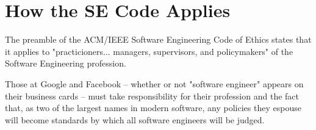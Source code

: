 
\section{How the SE Code Applies}

The preamble of the ACM/IEEE Software Engineering Code of Ethics states that it applies to "practicioners... managers, supervisors, and policymakers" of the Software Engineering profession. \cite{se_code}

Those at Google and Facebook -- whether or not "software engineer" appears on their business cards -- must take responsibility for their profession and the fact that, as two of the largest names in modern software, any policies they espouse will become standards by which all software engineers will be judged.